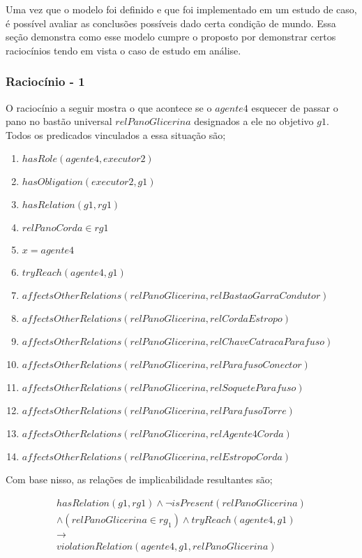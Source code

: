 Uma vez que o modelo foi definido e que foi implementado em um estudo de caso, é possível avaliar as conclusões possíveis dado certa condição de mundo. Essa seção demonstra 
como esse modelo cumpre o proposto por demonstrar certos raciocínios tendo em vista o caso de estudo em análise. 

\subsubsection{Raciocínio - 1} 


O raciocínio a seguir mostra o que acontece se o $agente4$ esquecer de passar o pano no bastão universal $relPanoGlicerina$ designados a ele no objetivo $g1$. 
Todos os predicados vinculados a essa situação são;

\begin{enumerate}
	\item $hasRole(agente4,executor2)$ 
	\item $hasObligation(executor2,g1)$
	\item $hasRelation(g1,rg1)$ 
	\item $relPanoCorda \in rg1$
	\item $ x = agente4 $
	\item $tryReach(agente4,g1)$
	\item $affectsOtherRelations(relPanoGlicerina,relBastaoGarraCondutor)$
	\item $affectsOtherRelations(relPanoGlicerina,relCordaEstropo)$  
	\item $affectsOtherRelations(relPanoGlicerina,relChaveCatracaParafuso)$
	\item $affectsOtherRelations(relPanoGlicerina,relParafusoConector)$ 
	\item $affectsOtherRelations(relPanoGlicerina,relSoqueteParafuso)$ 
	\item $affectsOtherRelations(relPanoGlicerina,relParafusoTorre)$
	\item $affectsOtherRelations(relPanoGlicerina,relAgente4Corda)$ 
	\item $affectsOtherRelations(relPanoGlicerina,relEstropoCorda)$	
\end{enumerate}

Com base nisso, as relações de implicabilidade resultantes são;

\begin{eqnarray}\nonumber
	hasRelation(g1,rg1)\wedge \neg isPresent(relPanoGlicerina)  \nonumber \\ 
	\wedge (relPanoGlicerina\in rg_1) \wedge tryReach(agente4,g1) \nonumber \\ 
	\to \nonumber \\ 
	violationRelation(agente4,g1,relPanoGlicerina) \nonumber \\	
\end{eqnarray}


